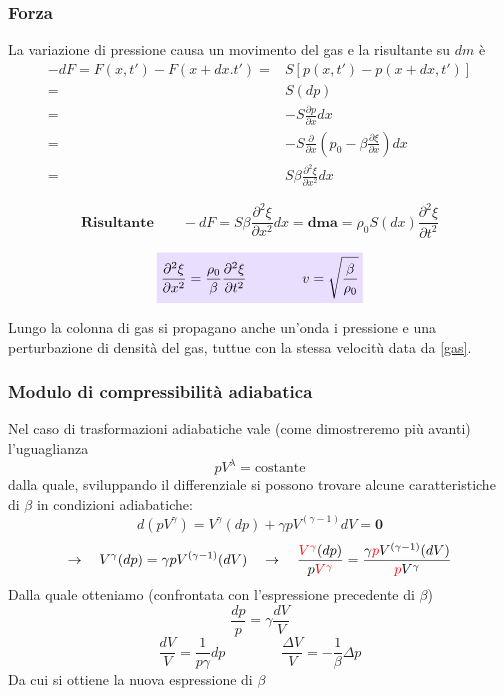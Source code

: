 \documentclass[x11names]{article}
\newcommand{\viola}[1]{\colorbox{myred}{$\displaystyle #1$}}
\begin{document}
	\subsubsection{Forza}
	La variazione di pressione causa un movimento del gas e la risultante su $dm$ è 
	\begin{align*}
	-dF = F(x,t') - F(x+dx.t') =& S\left[p(x,t') - p(x+dx,t')\right] \\
							   =& S(dp) \\
							   =& -S\frac{\partial p}{\partial x}dx \\
							   =& -S\frac{\partial}{\partial x}\left(p_0 - \beta\frac{\partial \xi}{\partial x}\right)dx \\
							   =& S\beta\frac{\partial^2\xi}{\partial x^2}dx
	\end{align*}
	
	\[ 
	\textbf{Risultante} \qquad	-dF = S\beta\frac{\partial^2\xi}{\partial x^2}dx  \mathbf{= dm a} = \rho_0 S(dx) \frac{\partial^2 \xi}{\partial t^2} 
	\]
	
	\begin{equation} \label{gas}
		\viola{\frac{\partial^2\xi}{\partial x^2} = \frac{\rho_0}{\beta} \frac{\partial^2 \xi}{\partial t^2} \qquad \qquad v = \sqrt{\frac{\beta}{\rho_0}}}
	\end{equation}
	
	Lungo la colonna di gas si propagano anche un'onda i pressione e una perturbazione di densità del gas, tuttue con la stessa velocitù data da \ref{gas}.
	
	\subsubsection{Modulo di compressibilità adiabatica}
	Nel caso di trasformazioni adiabatiche vale (come dimostreremo più avanti) l'uguaglianza
	\[
	pV^\lambda = \text{costante}
	\]
	dalla quale, sviluppando il differenziale si possono trovare alcune caratteristiche di \(\beta\) in condizioni adiabatiche:
	\[
	d\left(pV^\gamma\right) = V^\gamma (dp) + \gamma p V^{(\gamma - 1)}dV \boldsymbol{= 0}
	\]
	\[ 
	\to \quad  V^\gamma (dp) = \gamma p V^{(\gamma - 1)}(dV) \quad \to \quad \frac{\textcolor{red}{V^\gamma} (dp)}{p\textcolor{red}{V^\gamma}} = \frac{\gamma \textcolor{red}{p} V^{(\gamma - 1)}(dV)}{\textcolor{red}{p}V^\gamma}
	\]
	Dalla quale otteniamo (confrontata con l'espressione precedente di \(\beta\))
	\[ 
	\frac{dp}{p} = \gamma\frac{dV}{V} 
	\]
	\[ 
	\frac{dV}{V} = \frac{1}{p\gamma}dp  \qquad \qquad \frac{\Delta V}{V} = -\frac{1}{\beta} \Delta p
	\]
	Da cui si ottiene la nuova espressione di \(\beta\)
	
\end{document}
